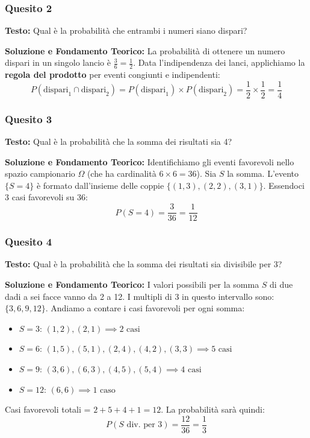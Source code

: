 \documentclass[12pt, a4paper]{article}
\begin{document}
\subsubsection*{Quesito 2}
\textbf{Testo:} Qual è la probabilità che entrambi i numeri siano dispari?

\textbf{Soluzione e Fondamento Teorico:} 
La probabilità di ottenere un numero dispari in un singolo lancio è $\frac{3}{6} = \frac{1}{2}$. Data l'indipendenza dei lanci, applichiamo la \textbf{regola del prodotto} per eventi congiunti e indipendenti:
$$ P(\text{dispari}_1 \cap \text{dispari}_2) = P(\text{dispari}_1) \times P(\text{dispari}_2) = \frac{1}{2} \times \frac{1}{2} = \frac{1}{4} $$

\subsubsection*{Quesito 3}
\textbf{Testo:} Qual è la probabilità che la somma dei risultati sia 4?

\textbf{Soluzione e Fondamento Teorico:} 
Identifichiamo gli eventi favorevoli nello spazio campionario $\Omega$ (che ha cardinalità $6 \times 6 = 36$). Sia $S$ la somma. L'evento $\{S = 4\}$ è formato dall'insieme delle coppie $\{(1,3), (2,2), (3,1)\}$. Essendoci 3 casi favorevoli su 36:
$$ P(S=4) = \frac{3}{36} = \frac{1}{12} $$

\subsubsection*{Quesito 4}
\textbf{Testo:} Qual è la probabilità che la somma dei risultati sia divisibile per 3?

\textbf{Soluzione e Fondamento Teorico:} 
I valori possibili per la somma $S$ di due dadi a sei facce vanno da 2 a 12. I multipli di 3 in questo intervallo sono: $\{3, 6, 9, 12\}$.
Andiamo a contare i casi favorevoli per ogni somma:
\begin{itemize}
    \item $S=3$: $(1,2), (2,1) \implies 2 \text{ casi}$
    \item $S=6$: $(1,5), (5,1), (2,4), (4,2), (3,3) \implies 5 \text{ casi}$
    \item $S=9$: $(3,6), (6,3), (4,5), (5,4) \implies 4 \text{ casi}$
    \item $S=12$: $(6,6) \implies 1 \text{ caso}$
\end{itemize}
Casi favorevoli totali = $2 + 5 + 4 + 1 = 12$. La probabilità sarà quindi:
$$ P(S \text{ div. per 3}) = \frac{12}{36} = \frac{1}{3} $$
\end{document}

